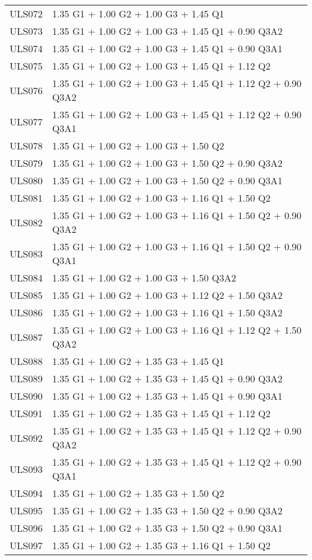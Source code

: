 \begin{center}
\begin{small}
\begin{longtable}{|l|p{10cm}|}
ULS072 & 1.35 G1 + 1.00 G2 + 1.00 G3 + 1.45 Q1\\
ULS073 & 1.35 G1 + 1.00 G2 + 1.00 G3 + 1.45 Q1 + 0.90 Q3A2\\
ULS074 & 1.35 G1 + 1.00 G2 + 1.00 G3 + 1.45 Q1 + 0.90 Q3A1\\
ULS075 & 1.35 G1 + 1.00 G2 + 1.00 G3 + 1.45 Q1 + 1.12 Q2\\
ULS076 & 1.35 G1 + 1.00 G2 + 1.00 G3 + 1.45 Q1 + 1.12 Q2 + 0.90 Q3A2\\
ULS077 & 1.35 G1 + 1.00 G2 + 1.00 G3 + 1.45 Q1 + 1.12 Q2 + 0.90 Q3A1\\
ULS078 & 1.35 G1 + 1.00 G2 + 1.00 G3 + 1.50 Q2\\
ULS079 & 1.35 G1 + 1.00 G2 + 1.00 G3 + 1.50 Q2 + 0.90 Q3A2\\
ULS080 & 1.35 G1 + 1.00 G2 + 1.00 G3 + 1.50 Q2 + 0.90 Q3A1\\
ULS081 & 1.35 G1 + 1.00 G2 + 1.00 G3 + 1.16 Q1 + 1.50 Q2\\
ULS082 & 1.35 G1 + 1.00 G2 + 1.00 G3 + 1.16 Q1 + 1.50 Q2 + 0.90 Q3A2\\
ULS083 & 1.35 G1 + 1.00 G2 + 1.00 G3 + 1.16 Q1 + 1.50 Q2 + 0.90 Q3A1\\
ULS084 & 1.35 G1 + 1.00 G2 + 1.00 G3 + 1.50 Q3A2\\
ULS085 & 1.35 G1 + 1.00 G2 + 1.00 G3 + 1.12 Q2 + 1.50 Q3A2\\
ULS086 & 1.35 G1 + 1.00 G2 + 1.00 G3 + 1.16 Q1 + 1.50 Q3A2\\
ULS087 & 1.35 G1 + 1.00 G2 + 1.00 G3 + 1.16 Q1 + 1.12 Q2 + 1.50 Q3A2\\
ULS088 & 1.35 G1 + 1.00 G2 + 1.35 G3 + 1.45 Q1\\
ULS089 & 1.35 G1 + 1.00 G2 + 1.35 G3 + 1.45 Q1 + 0.90 Q3A2\\
ULS090 & 1.35 G1 + 1.00 G2 + 1.35 G3 + 1.45 Q1 + 0.90 Q3A1\\
ULS091 & 1.35 G1 + 1.00 G2 + 1.35 G3 + 1.45 Q1 + 1.12 Q2\\
ULS092 & 1.35 G1 + 1.00 G2 + 1.35 G3 + 1.45 Q1 + 1.12 Q2 + 0.90 Q3A2\\
ULS093 & 1.35 G1 + 1.00 G2 + 1.35 G3 + 1.45 Q1 + 1.12 Q2 + 0.90 Q3A1\\
ULS094 & 1.35 G1 + 1.00 G2 + 1.35 G3 + 1.50 Q2\\
ULS095 & 1.35 G1 + 1.00 G2 + 1.35 G3 + 1.50 Q2 + 0.90 Q3A2\\
ULS096 & 1.35 G1 + 1.00 G2 + 1.35 G3 + 1.50 Q2 + 0.90 Q3A1\\
ULS097 & 1.35 G1 + 1.00 G2 + 1.35 G3 + 1.16 Q1 + 1.50 Q2\\

\end{longtable}
\end{small}
\end{center}
